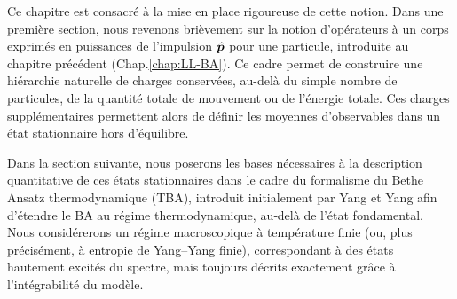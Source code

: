 \medskip

Ce chapitre est consacré à la mise en place rigoureuse de cette notion.  
Dans une première section, nous revenons brièvement sur la notion d’opérateurs à un corps exprimés en puissances de l’impulsion $\hat{\bm{p}}$ pour une particule, introduite au chapitre précédent (Chap.\ref{chap:LL-BA}).  
Ce cadre permet de construire une hiérarchie naturelle de charges conservées, au-delà du simple nombre de particules, de la quantité totale de mouvement ou de l’énergie totale.  
Ces charges supplémentaires permettent alors de définir les moyennes d’observables dans un état stationnaire hors d’équilibre.

\medskip


Dans la section suivante, nous poserons les bases nécessaires à la description quantitative de ces états stationnaires dans le cadre du formalisme du Bethe Ansatz thermodynamique (\gls{TBA}), introduit initialement par Yang et Yang \cite{YangYang_1969} afin d’étendre le \gls{BA} au régime thermodynamique, au‑delà de l’état fondamental.
 Nous considérerons un régime macroscopique à température finie (ou, plus précisément, à entropie de Yang–Yang finie), correspondant à des états hautement excités du spectre, mais toujours décrits exactement grâce à l’intégrabilité du modèle.

